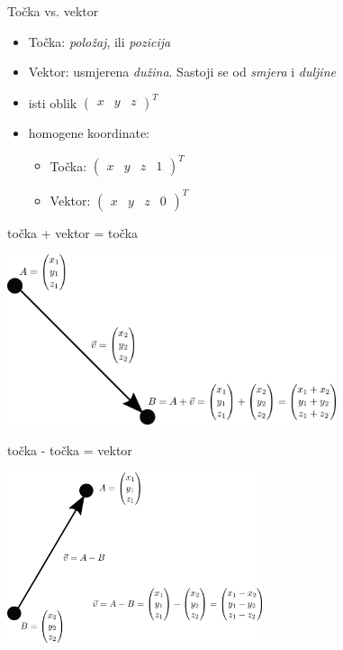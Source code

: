\documentclass[9pt]{beamer}
\begin{document}
\begin{frame}{Točka vs. vektor}
	\begin{itemize}
		\item Točka: \textit{položaj}, ili \textit{pozicija}
		\item Vektor: usmjerena \textit{dužina}. Sastoji se od \textit{smjera} i \textit{duljine} 
		\item isti oblik $\begin{pmatrix} x & y & z\end{pmatrix}^T$ 
		\item homogene koordinate:
		\begin{itemize}
			\item Točka: $\begin{pmatrix} x & y & z & 1\end{pmatrix}^T$
			\item Vektor: $\begin{pmatrix} x & y & z & 0\end{pmatrix}^T$
		\end{itemize}
	\end{itemize}
\end{frame}

\begin{frame}{točka + vektor = točka}
	\begin{center}
		\includegraphics[height=5cm]{./slike/linear_algebra_point_plus_vector.png}
	\end{center}
\end{frame}

\begin{frame}{točka - točka = vektor}
	\begin{center}
		\includegraphics[height=5cm]{./slike/linear_algebra_point_minus_vector.png}
	\end{center}
\end{frame}
\end{document}
